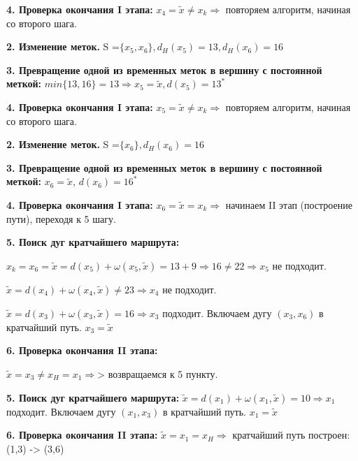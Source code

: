 \documentclass[12pt, a4paper, oneside]{article}
\theoremstyle{plain} %
\theoremstyle{definition}
\begin{document}
\textbf{4. Проверка окончания I этапа: } $x_4 = \tilde x \neq x_k \Rightarrow$ повторяем алгоритм, начиная со второго шага.

\textbf{2. Изменение меток.} S =$\{x_5, x_6 \}, d_H(x_5) = 13, d_H(x_6) = 16$

\textbf{3. Превращение одной из временных меток в вершину с постоянной меткой: } $min\{13,16\} = 13 \Rightarrow x_5 = \tilde x, d(x_5) = 13^*$

\textbf{4. Проверка окончания I этапа: } $x_5 = \tilde x \neq x_k \Rightarrow$ повторяем алгоритм, начиная со второго шага.

\textbf{2. Изменение меток.} S =$\{x_6 \},  d_H(x_6) = 16$

\textbf{3. Превращение одной из временных меток в вершину с постоянной меткой: } $x_6 = \tilde x$, $d(x_6) = 16^*$

\textbf{4. Проверка окончания I этапа: } $x_6 = \tilde x = x_k \Rightarrow$ начинаем II этап (построение пути), переходя к 5 шагу.

\textbf{5. Поиск дуг кратчайшего маршрута: }

$ x_k = x_6 = \tilde x = d(x_5) + \omega(x_5, \tilde x ) = 13 + 9 \Rightarrow 16 \neq 22 \Rightarrow x_5$ не подходит.

$\tilde x = d(x_4) + \omega(x_4, \tilde x ) \neq 23 \Rightarrow x_4$ не подходит.

$\tilde x = d(x_3) + \omega(x_3, \tilde x ) = 16 \Rightarrow x_3$ подходит. Включаем дугу $(x_3,x_6)$ в кратчайший путь. $x_3 = \tilde x$

\textbf{6. Проверка окончания II этапа: }

$\tilde x = x_3 \neq x_H = x_1 \Rightarrow$> возвращаемся к 5 пункту.

\textbf{5. Поиск дуг кратчайшего маршрута: } $\tilde x = d(x_1) + \omega(x_1, \tilde x ) = 10 \Rightarrow x_1$ подходит. Включаем дугу $(x_1,x_3)$ в кратчайший путь. $x_1 = \tilde x$

\textbf{6. Проверка окончания II этапа: } $\tilde x = x_1 = x_H \Rightarrow$ кратчайший путь построен: (1,3) -> (3,6)
\end{document}
